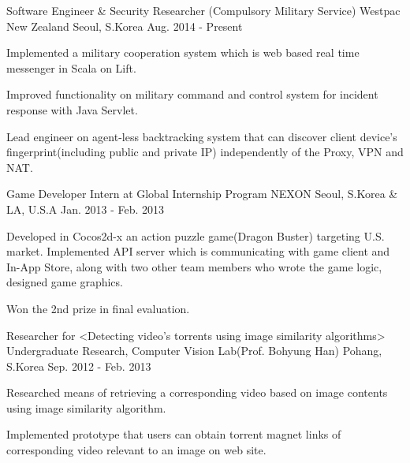 


\begin{cventries}


\cventry
{Software Engineer \& Security Researcher (Compulsory Military Service)} %
{Westpac New Zealand} %
{Seoul, S.Korea} %
{Aug. 2014 - Present} %
{ %
\begin{cvitems}
\item {Implemented a military cooperation system which is web based real time messenger in Scala on Lift.}
\item {Improved functionality on military command and control system for incident response with Java Servlet.}
\item {Lead engineer on agent-less backtracking system that can discover client device's fingerprint(including public and private IP) independently of the Proxy, VPN and NAT.}
\end{cvitems}
}


\cventry
{Game Developer Intern at Global Internship Program} %
{NEXON} %
{Seoul, S.Korea \& LA, U.S.A} %
{Jan. 2013 - Feb. 2013} %
{ %
\begin{cvitems}
\item {Developed in Cocos2d-x an action puzzle game(Dragon Buster) targeting U.S. market. Implemented API server which is communicating with game client and In-App Store, along with two other team members who wrote the game logic, designed game graphics.}
\item {Won the 2nd prize in final evaluation.}
\end{cvitems}
}


\cventry
{Researcher for <Detecting video’s torrents using image similarity algorithms>} %
{Undergraduate Research, Computer Vision Lab(Prof. Bohyung Han)} %
{Pohang, S.Korea} %
{Sep. 2012 - Feb. 2013} %
{ %
\begin{cvitems}
\item {Researched means of retrieving a corresponding video based on image contents using image similarity algorithm.}
\item {Implemented prototype that users can obtain torrent magnet links of corresponding video relevant to an image on web site.}
\end{cvitems}
}


\end{cventries}
